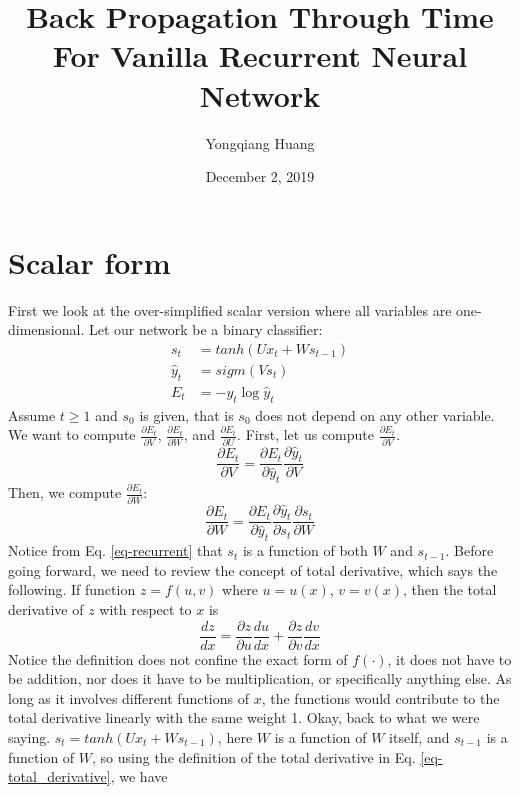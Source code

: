 \documentclass{article}
\title{Back Propagation Through Time For Vanilla Recurrent Neural Network}
\author{Yongqiang Huang}
\date{December 2, 2019}
\begin{document}
\maketitle
\section{Scalar form}
First we look at the over-simplified scalar version where all variables are one-dimensional. Let our network be a binary classifier:
\begin{align}
    s_t &= tanh(Ux_t + Ws_{t-1}) \label{eq-recurrent} \\
    \hat{y}_t &= sigm(Vs_t) \\
    E_t &= -y_t\log \hat{y}_t
\end{align}
Assume $t \geq 1$ and $s_0$ is given, that is $s_0$ does not depend on any other variable. We want to compute $\frac{\partial E_t}{\partial V}$, $\frac{\partial E_t}{\partial W}$, and  $\frac{\partial E_t}{\partial U}$. First, let us compute $\frac{\partial E_t}{\partial V}$. 
\begin{equation}
    \frac{\partial E_t}{\partial V} = \frac{\partial E_t}{\partial \hat{y}_t}\frac{\partial \hat{y}_t}{\partial V}
\end{equation}
Then, we compute $\frac{\partial E_t}{\partial W}$:
\begin{equation}
    \frac{\partial E_t}{\partial W} = \frac{\partial E_t}{\partial \hat{y}_t}\frac{\partial \hat{y}_t}{\partial s_t}\frac{\partial s_t}{\partial W}
\end{equation}
Notice from Eq. \eqref{eq-recurrent} that $s_t$ is a function of both $W$ and $s_{t-1}$. Before going forward, we need to review the concept of total derivative, which says the following. If function $z = f(u, v)$ where $u = u(x)$, $v = v(x)$, then the total derivative of $z$ with respect to $x$ is
\begin{equation} \label{eq-total_derivative}
    \frac{dz}{dx} = \frac{\partial z}{\partial u}\frac{du}{dx} + \frac{\partial z}{\partial v}\frac{dv}{dx}
\end{equation}
Notice the definition does not confine the exact form of $f(\cdot)$, it does not have to be addition, nor does it have to be multiplication, or specifically anything else. As long as it involves different functions of $x$, the functions would contribute to the total derivative linearly with the same weight 1. Okay, back to what we were saying. $s_t = tanh(Ux_t + Ws_{t-1})$, here $W$ is a function of $W$ itself, and $s_{t-1}$ is a function of $W$, so using the definition of the total derivative in Eq. \eqref{eq-total_derivative}, we have 
\end{document}
